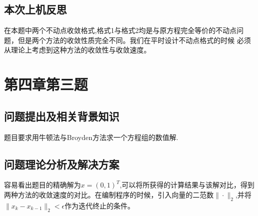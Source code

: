 \documentclass{ctexart}
\begin{document}
\subsection{本次上机反思}
在本题中两个不动点收敛格式,格式1与格式2均是与原方程完全等价的不动点问题，但是两个方法的收敛性质完全不同。我们在平时设计不动点格式的时候
必须从理论上考虑到这种方法的收敛性与收敛速度。
\section{第四章第三题}
\subsection{问题提出及相关背景知识}
题目要求用牛顿法与Broyden方法求一个方程组的数值解.
\subsection{问题理论分析及解决方案}
容易看出题目的精确解为$x=(0,1)^T$,可以将所获得的计算结果与该解对比，得到两种方法的收敛速度的对比。在编制程序的时候，引入向量的二范数$\|\cdot \|_2$,并将$\|x_k-x_{k-1}\|_2<\epsilon$作为迭代终止的条件。
\end{document}
